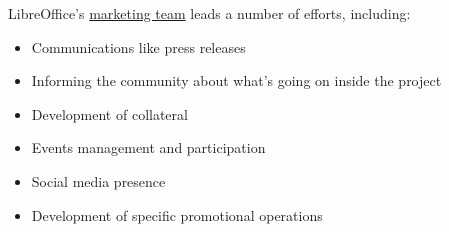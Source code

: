 \begin{kaobox}[frametitle=Marketing efforts of LibreOffice]

LibreOffice's \href{https://www.libreoffice.org/community/marketing/}{marketing team} leads a number of efforts, including:

\begin{itemize}

\item Communications like press releases

\item Informing the community about what's going on inside the project

\item Development of collateral

\item Events management and participation

\item Social media presence

\item Development of specific promotional operations

\end{itemize}

\end{kaobox}

